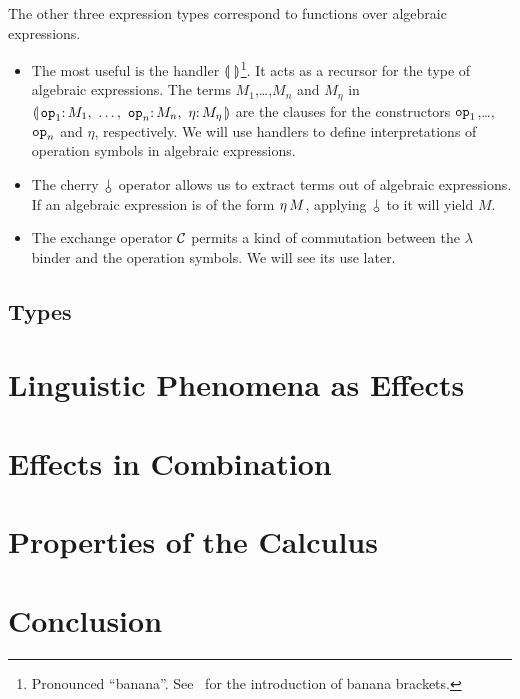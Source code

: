 \documentclass{llncs}
\begin{document}
The other three expression types correspond to functions over algebraic
expressions.
\begin{itemize}
\item The most useful is the handler $\llparenthesis \,  \, \rrparenthesis$\footnote{Pronounced
  ``banana''. See~\cite{meijer1991functional} for the introduction of
  banana brackets.}. It acts as a recursor for the type of algebraic
  expressions. The terms $M_1$,\ldots,$M_n$ and $M_\eta$ in $\cdbanana$ are
  the clauses for the constructors $\mathtt{op}_1$,\ldots,$\mathtt{op}_n$ and
  $\eta$, respectively. We will use handlers to define interpretations of
  operation symbols in algebraic expressions.
\item The cherry $\cherry$ operator allows us to extract terms out of
  algebraic expressions. If an algebraic expression is of the form
  $\eta\,M$, applying $\cherry$ to it will yield $M$.
\item The exchange operator $\mathcal{C}$ permits a kind of commutation between the
  $\lambda$ binder and the operation symbols. We will see its use later.
\end{itemize}

\subsection{Types}
\label{ssec:types}

\section{Linguistic Phenomena as Effects}
\label{sec:phenomena}


\section{Effects in Combination}
\label{sec:combination}


\section{Properties of the Calculus}
\label{sec:properties}


\section{Conclusion}
\label{sec:conclusion}

%
%


\end{document}

